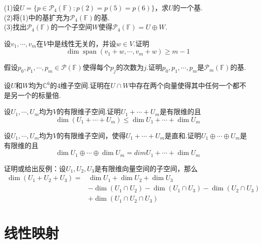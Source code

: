 \documentclass[lang=cn, zihao=5]{elegantbook}
\newcommand{\C}{\mathbb{C}}
\newcommand{\F}{\mathbb{F}}
\DeclareMathOperator{\spn}{span}
\begin{document}
\begin{exercise}
	(1)设$U=\{ p \in \mathcal{P}_{4} (\F) : p(2)=p(5)=p(6) \}$，求$U$的一个基. \\
	(2)将(1)中的基扩充为$\mathcal{P}_{4} (\F)$的基. \\
	(3)找出$\mathcal{P}_{4} (\F)$的一个子空间$W$使得$\mathcal{P}_{4} (\F) = U \oplus W$.
\end{exercise}

\begin{exercise}
	设$v_1, \cdots ,v_m$在$V$中是线性无关的，并设$w \in V$.证明$$\dim \spn (v_1+w, \cdots ,v_m+w) \geq m-1$$
\end{exercise}

\begin{exercise}
	假设$p_0,p_1, \cdots ,p_m \in \mathcal{P} (\F)$使得每个$p_j$的次数为$j$.证明$p_0,p_1, \cdots ,p_m$是$\mathcal{P}_m (\F)$的基.
\end{exercise}

\begin{exercise}
	设$U$和$W$均为$\C ^{6}$的$4$维子空间.证明在$U \cap W$中存在两个向量使得其中任何一个都不是另一个的标量倍.
\end{exercise}

\begin{exercise}
	设$U_1,\cdots ,U_m$均为$V$的有限维子空间.证明$U_1 + \cdots + U_m$是有限维的且$$\dim (U_1 + \cdots + U_m) \leq \dim U_1 +\cdots + \dim U_m$$
\end{exercise}

\begin{exercise}
	设$U_1,\cdots ,U_m$均为$V$的有限维子空间，使得$U_1 + \cdots + U_m$是直和.证明$U_1 \oplus \cdots \oplus U_m$是有限维的且$$\dim U_1 \oplus \cdots \oplus \dim U_m = dim U_1 +\cdots + \dim U_m$$
\end{exercise}

\begin{exercise}
	证明或给出反例：设$U_1,U_2,U_3$是有限维向量空间的子空间，那么
	\begin{align*}
		\dim (U_1+U_2+U_3) = &\dim U_1 + \dim U_2 + \dim U_3 \\ 
		&- \dim (U_1 \cap U_2) - \dim (U_1 \cap U_3) - \dim (U_2 \cap U_3) \\
		&+ \dim (U_1 \cap U_2 \cap U_3)
	\end{align*}
\end{exercise}

\chapter{线性映射}
\end{document}
